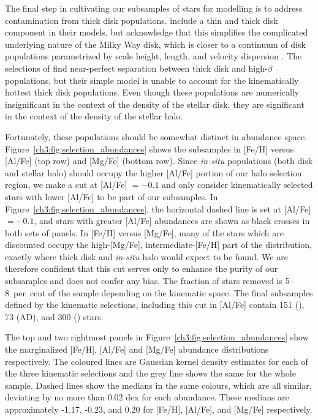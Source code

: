 The final step in cultivating our subsamples of \gse stars for modelling is to address contamination from thick disk populations. \cite{lane22} include a thin and thick disk component in their models, but acknowledge that this simplifies the complicated underlying nature of the Milky Way disk, which is closer to a continuum of disk populations parametrized by scale height, length, and velocity dispersion \parencite{bovy12d}. The selections of \cite{lane22} find near-perfect separation between thick disk and high-$\beta$ populations, but their simple model is unable to account for the kinematically hottest thick disk populations. Even though these populations are numerically insignificant in the context of the density of the stellar disk, they are significant in the context of the density of the stellar halo.

Fortunately, these populations should be somewhat distinct in abundance space. Figure~\ref{ch3:fig:selection_abundances} shows the \gse subsamples in [Fe/H] versus [Al/Fe] (top row) and [Mg/Fe] (bottom row). Since \textit{in-situ} populations (both disk and stellar halo) should occupy the higher [Al/Fe] portion of our halo selection region, we make a cut at [Al/Fe] $= -0.1$ and only consider kinematically selected stars with lower [Al/Fe] to be part of our \gse subsamples. In Figure~\ref{ch3:fig:selection_abundances}, the horizontal dashed line is set at [Al/Fe] $= -0.1$, and stars with greater [Al/Fe] abundances are shown as black crosses in both sets of panels. In [Fe/H] versus [Mg/Fe], many of the stars which are discounted occupy the high-[Mg/Fe], intermediate-[Fe/H] part of the distribution, exactly where thick disk and \textit{in-situ} halo would expect to be found. We are therefore confident that this cut serves only to enhance the purity of our \gse subsamples and does not confer any bias. The fraction of stars removed is 5--8~per~cent of the sample depending on the kinematic space. The final \gse subsamples defined by the kinematic selections, including this cut in [Al/Fe] contain 151 (\eLz), 73 (AD), and 300 (\JRLz) stars.

The top and two rightmost panels in Figure~\ref{ch3:fig:selection_abundances} show the marginalized [Fe/H], [Al/Fe] and [Mg/Fe] abundance distributions respectively. The coloured lines are Gaussian kernel density estimates for each of the three kinematic selections and the grey line shows the same for the whole sample. Dashed lines show the medians in the same colours, which are all similar, deviating by no more than 0.02 dex for each abundance. These medians are approximately -1.17, -0.23, and 0.20 for [Fe/H], [Al/Fe], and [Mg/Fe] respectively.


